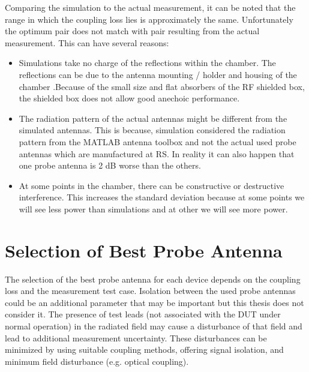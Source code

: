 Comparing the simulation to the actual measurement, it can be noted that the range in which the coupling loss lies is approximately the same. Unfortunately the optimum pair does not match with pair resulting from the actual measurement. This can have several reasons: 
\begin{itemize}
\item Simulations take no charge of the reflections within the chamber. The reflections can be due to the antenna mounting / holder and housing of the chamber .Because of the small size and flat absorbers of the \acs{RF} shielded box, the shielded box does not allow good anechoic performance.
\item The radiation pattern of the actual antennas might be different from the simulated antennas. This is because, simulation considered the radiation pattern from the MATLAB\textregistered{} antenna toolbox and not the actual used probe antennas which are manufactured at \acs{RS}\textregistered{}. In reality it can also happen that one probe antenna is 2 dB worse than the others. 
\item At some points in the chamber, there can be constructive or destructive interference. This increases the standard deviation because at some points we will see less power than simulations and at other we will see more power.
\end{itemize}







\section{Selection of Best Probe Antenna}
The selection of the best probe antenna for each device depends on the coupling loss and the measurement test case. Isolation between the used probe antennas could be an additional parameter that may be important but this thesis does not consider it. The presence of test leads (not associated with the DUT under normal operation) in the radiated field may cause a disturbance of that field and lead to additional measurement uncertainty. These disturbances can be minimized by using suitable coupling methods, offering signal isolation, and minimum field disturbance (e.g. optical coupling). \\

